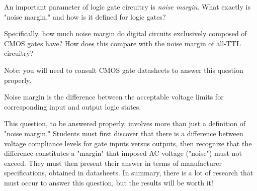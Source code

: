 

An important parameter of logic gate circuitry is {\it noise margin}.  What exactly is "noise margin," and how is it defined for logic gates?

Specifically, how much noise margin do digital circuits exclusively composed of CMOS gates have?  How does this compare with the noise margin of all-TTL circuitry?

\vskip 10pt

Note: you will need to consult CMOS gate datasheets to answer this question properly.







Noise margin is the difference between the acceptable voltage limits for corresponding input and output logic states.







This question, to be answered properly, involves more than just a definition of "noise margin."  Students must first discover that there is a difference between voltage compliance levels for gate inputs versus outputs, then recognize that the difference constitutes a "margin" that imposed AC voltage ("noise") must not exceed.  They must then present their answer in terms of manufacturer specifications, obtained in datasheets.  In summary, there is a lot of research that must occur to answer this question, but the results will be worth it!




